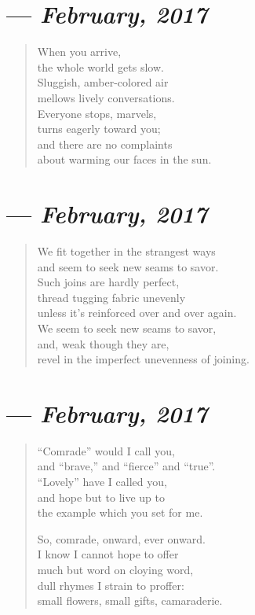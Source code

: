 \section{--- \textit{February, 2017}}

\begin{verse}
  When you arrive,\\
  the whole world gets slow.\\
  Sluggish, amber-colored air\\
  mellows lively conversations.\\
  Everyone stops, marvels,\\
  turns eagerly toward you;\\
  and there are no complaints\\
  about warming our faces in the sun.
\end{verse}
\newpage

\section{--- \textit{February, 2017}}

\begin{verse}
  We fit together in the strangest ways\\
  and seem to seek new seams to savor.\\
  Such joins are hardly perfect,\\
  thread tugging fabric unevenly\\
  unless it's reinforced over and over again.\\
  We seem to seek new seams to savor,\\
  and, weak though they are,\\
  revel in the imperfect unevenness of joining.
\end{verse}
\newpage

\section{--- \textit{February, 2017}}

\begin{verse}
  ``Comrade'' would I call you,\\
  and ``brave,'' and ``fierce'' and ``true''.\\
  ``Lovely'' have I called you,\\
  and hope but to live up to\\
  the example which you set for me.

  So, comrade, onward, ever onward.\\
  I know I cannot hope to offer\\
  much but word on cloying word,\\
  dull rhymes I strain to proffer:\\
  small flowers, small gifts, camaraderie.
\end{verse}
\newpage

